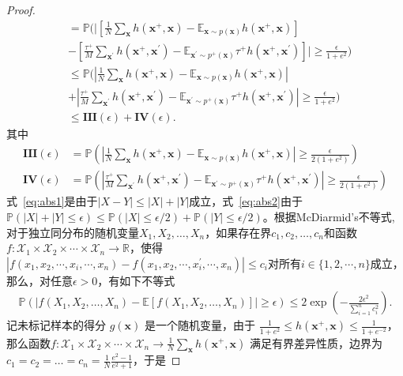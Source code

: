 \begin{lemma}
\begin{proof}
\begin{align}
			&= \mathbb{P} (|[\frac{1}{N}  \sum_{\mathbf{x}} h(\mathbf{x}^+,\mathbf{x}) -\mathbb{E}_{\mathbf x \sim p(\mathbf x)}  h(\mathbf{x}^+,\mathbf{x}) ] \\
			&-[\frac{\tau^+}{M} \sum_{\mathbf{x}^\prime} h(\mathbf{x}^+,\mathbf{x}^\prime)  -\mathbb{E}_{\mathbf x^\prime \sim p^+(\mathbf x)}  \tau^+h(\mathbf{x}^+,\mathbf{x}^\prime)]| \geq \frac{\epsilon}{1+e^2}  ) \nonumber\\
			&\leq \mathbb{P} (|\frac{1}{N}  \sum_{\mathbf{x}} h(\mathbf{x}^+,\mathbf{x}) -\mathbb{E}_{\mathbf x \sim p(\mathbf x)}  h(\mathbf{x}^+,\mathbf{x})| \label{eq:abs1}\\
			&+|\frac{\tau^+}{M} \sum_{\mathbf{x}^\prime} h(\mathbf{x}^+,\mathbf{x}^\prime)  -\mathbb{E}_{\mathbf x^\prime \sim p^+(\mathbf x)}  \tau^+h(\mathbf{x}^+,\mathbf{x}^\prime)| \geq \frac{\epsilon}{1+e^2}  ) \nonumber\\
			&\leq \mathbf{III} (\epsilon) + \mathbf{IV} (\epsilon). \label{eq:abs2}
		\end{align}
其中
		\begin{align}
			\mathbf{III} (\epsilon) &= \mathbb{P}(|\frac{1}{N}  \sum_{\mathbf{x}} h(\mathbf{x}^+,\mathbf{x}) -\mathbb{E}_{\mathbf x \sim p(\mathbf x)}  h(\mathbf{x}^+,\mathbf{x})| \geq \frac{\epsilon}{2(1+e^2)}  ) \\
			\mathbf{IV} (\epsilon) &=\mathbb{P}(|\frac{\tau^+}{M} \sum_{\mathbf{x}^\prime} h(\mathbf{x}^+,\mathbf{x}^\prime)  -\mathbb{E}_{\mathbf x^\prime \sim p^+(\mathbf x)}  \tau^+h(\mathbf{x}^+,\mathbf{x}^\prime)|\geq \frac{\epsilon}{2(1+e^2)}  ) 
		\end{align}
式~\eqref{eq:abs1}是由于$|X-Y| \leq |X|+|Y|$成立，式~\eqref{eq:abs2}由于
		$\mathbb{P}(|X|+|Y| \leq \epsilon) \leq \mathbb{P}(|X| \leq \epsilon/2) + \mathbb{P}(|Y| \leq \epsilon/2)$。根据McDiarmid's不等式, 对于独立同分布的随机变量$X_{1},X_{2},\dots ,X_{n}$，如果存在界${\displaystyle c_{1},c_{2},\dots ,c_{n}}$和函数${\displaystyle f:{\mathcal {X}}_{1}\times {\mathcal {X}}_{2}\times \cdots \times {\mathcal {X}}_{n}\rightarrow \mathbb {R} }$，使得$|f(x_1,x_2,\cdots,x_i,\cdots,x_n)-f(x_1,x_2,\cdots,x_i^\prime,\cdots,x_n)|\leq c_i$对所有$i\in \{1,2,\cdots,n\}$成立，那么，对任意$\epsilon >0$，有如下不等式
		\begin{eqnarray}
			\mathbb{P}(|f(X_{1},X_{2},\ldots ,X_{n})-\mathbb {E} [f(X_{1},X_{2},\ldots ,X_{n})]|\geq \epsilon )   \leq 2\exp \left(-{\frac {2\epsilon ^{2}}{\sum _{i=1}^{n}c_{i}^{2}}}\right). \nonumber
		\end{eqnarray}
记未标记样本的得分 $g(\mathbf{x})$ 是一个随机变量，由于 $ \frac{1}{1+e^{2}} \leq h(\mathbf{x}^+,\mathbf{x}) \leq \frac{1}{1+e^{-2}} $，那么函数$f:{\mathcal {X}}_{1}\times {\mathcal {X}}_{2}\times \cdots \times {\mathcal {X}}_{n}\rightarrow \frac{1}{N}  \sum_{\mathbf{x}}  h(\mathbf{x}^+,\mathbf{x})$ 满足有界差异性质，边界为 ${\displaystyle c_{1}=c_{2}=\dots =c_{n}} = \frac{1}{N}\frac{e^2-1}{e^2+1}$，于是

\end{proof}
\end{lemma}
